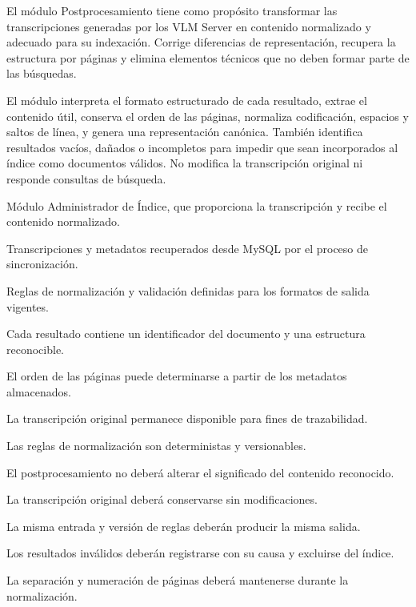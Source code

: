 \begin{definicionmodulo}

\item[Propósito] El módulo Postprocesamiento tiene como propósito transformar las transcripciones generadas por los VLM Server en contenido normalizado y adecuado para su indexación. Corrige diferencias de representación, recupera la estructura por páginas y elimina elementos técnicos que no deben formar parte de las búsquedas.

\item[Alcance] El módulo interpreta el formato estructurado de cada resultado, extrae el contenido útil, conserva el orden de las páginas, normaliza codificación, espacios y saltos de línea, y genera una representación canónica. También identifica resultados vacíos, dañados o incompletos para impedir que sean incorporados al índice como documentos válidos. No modifica la transcripción original ni responde consultas de búsqueda.

\item[Dependencias]
\begin{elementosmodulo}
    \item Módulo Administrador de Índice, que proporciona la transcripción y recibe el contenido normalizado.
    \item Transcripciones y metadatos recuperados desde MySQL por el proceso de sincronización.
    \item Reglas de normalización y validación definidas para los formatos de salida vigentes.
\end{elementosmodulo}

\item[Supuestos]
\begin{elementosmodulo}
    \item Cada resultado contiene un identificador del documento y una estructura reconocible.
    \item El orden de las páginas puede determinarse a partir de los metadatos almacenados.
    \item La transcripción original permanece disponible para fines de trazabilidad.
    \item Las reglas de normalización son deterministas y versionables.
\end{elementosmodulo}

\item[Restricciones]
\begin{elementosmodulo}
    \item El postprocesamiento no deberá alterar el significado del contenido reconocido.
    \item La transcripción original deberá conservarse sin modificaciones.
    \item La misma entrada y versión de reglas deberán producir la misma salida.
    \item Los resultados inválidos deberán registrarse con su causa y excluirse del índice.
    \item La separación y numeración de páginas deberá mantenerse durante la normalización.
\end{elementosmodulo}


\end{definicionmodulo}
